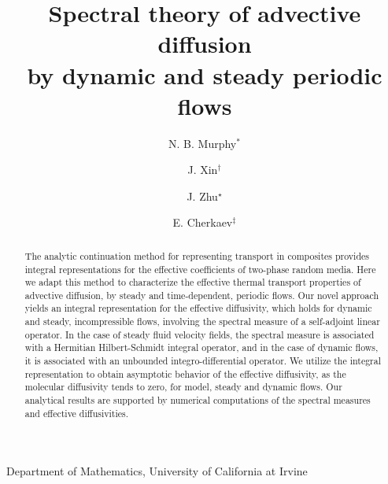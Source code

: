 \documentclass[11pt]{amsart}
\begin{document}
\title{Spectral theory of advective diffusion \\
  by dynamic and steady periodic flows}


\author{N. B. Murphy$^\ast$}
\address{$^*$Department of Mathematics, 340 Rowland Hall, University of
  California at Irvine, Irvine, CA 92697-3875, USA}

\author{J. Xin$^\dag$}
\address{$^{\dag}$Department of Mathematics, 340 Rowland Hall, University of
  California at Irvine, Irvine, CA 92697-3875, USA} 

\author{J. Zhu$^\star$}
\address{$^\star$University of Utah, Department of Mathematics, 155 S 1400 E
  RM 233, Salt Lake City, UT 84112-009, USA}

\author{E. Cherkaev$^\ddagger$}
\address{$^\ddagger$University of Utah, Department of Mathematics, 155 S 1400 E
  RM 233, Salt Lake City, UT 84112-009, USA} 

\maketitle
\vspace{-3ex}
\begin{center}
  Department of Mathematics, University of California at Irvine
\end{center}



\begin{abstract}
%
The analytic continuation method for representing transport in
composites provides integral representations for the
effective coefficients of two-phase random media. Here we adapt this 
method to characterize the effective thermal transport properties of
advective diffusion, by steady and time-dependent, periodic flows. Our
novel approach yields an integral representation for the
effective diffusivity, which holds for dynamic and steady,
incompressible flows, involving the spectral measure of a self-adjoint
linear operator. In the case of steady fluid velocity fields, the
spectral measure is associated with a Hermitian Hilbert-Schmidt
integral operator, and in the case of dynamic flows, it is associated
with an unbounded integro-differential operator. We utilize the
integral representation to obtain asymptotic behavior of the effective 
diffusivity, as the molecular diffusivity tends to zero, for model,
steady and dynamic flows. Our analytical results are supported by
numerical computations of the spectral measures and effective
diffusivities.    
%
\end{abstract}
\end{document}
